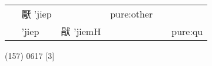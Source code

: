 \documentclass[14pt,a4paper]{scrartcl}
\begin{document}
\begin{longtable}[c]{@{}llllll@{}}
\begin{minipage}[t]{0.14\columnwidth}
\strut\end{minipage} &
\begin{minipage}[t]{0.14\columnwidth}\raggedright\strut
厭 'jiep
\strut\end{minipage} &
\begin{minipage}[t]{0.14\columnwidth}\raggedright\strut
\strut\end{minipage} &
\begin{minipage}[t]{0.14\columnwidth}\raggedright\strut
pure:other
\strut\end{minipage}\tabularnewline
\begin{minipage}[t]{0.14\columnwidth}\raggedright\strut
𤡜
\strut\end{minipage} &
\begin{minipage}[t]{0.14\columnwidth}\raggedright\strut
'jiep
\strut\end{minipage} &
\begin{minipage}[t]{0.14\columnwidth}\raggedright\strut
猒 'jiemH
\strut\end{minipage} &
\begin{minipage}[t]{0.14\columnwidth}\raggedright\strut
\strut\end{minipage} &
\begin{minipage}[t]{0.14\columnwidth}\raggedright\strut
\strut\end{minipage} &
\begin{minipage}[t]{0.14\columnwidth}\raggedright\strut
pure:qu
\strut\end{minipage}\tabularnewline
\bottomrule
\end{longtable}

(157) 0617 {[}3{]}
\end{document}
